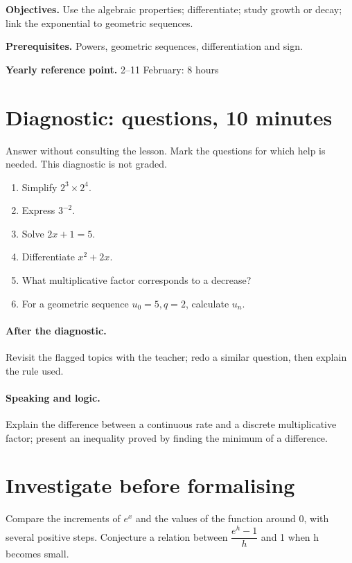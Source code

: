 \label{C09}
\begin{keypoint}
\textbf{Objectives.} Use the algebraic properties; differentiate; study growth or decay; link the exponential to geometric sequences.

\textbf{Prerequisites.} Powers, geometric sequences, differentiation and sign.

\textbf{Yearly reference point.} 2--11 February: 8 hours\end{keypoint}
\section*{Diagnostic:  questions, 10 minutes}\label{C09-D}
Answer without consulting the lesson. Mark the questions for which help is needed. This diagnostic is not graded.
\begin{enumerate}
\item Simplify $2^3\times2^4$.
\item Express $3^{-2}$.
\item Solve $2x+1=5$.
\item Differentiate $x^2+2x$.
\item What multiplicative factor corresponds to a  decrease?
\item For a geometric sequence $u_0=5,q=2$, calculate $u_n$.
\end{enumerate}
\paragraph{After the diagnostic.} Revisit the flagged topics with the teacher; redo a similar question, then explain the rule used.
\paragraph{Speaking and logic.} Explain the difference between a continuous rate and a discrete multiplicative factor; present an inequality proved by finding the minimum of a difference.
\mxnewpage
\section*{Investigate before formalising}\label{C09-RECH}
Compare the increments of $e^x$ and the values of the function around 0, with several positive steps. Conjecture a relation between $\dfrac{e^{h}-1}{h}$ and 1 when h becomes small.
